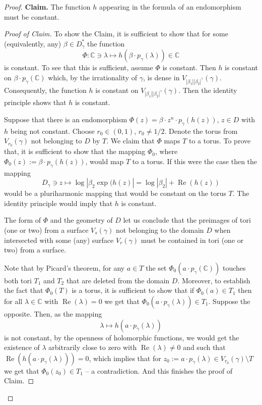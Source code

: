 \documentclass[a4paper,12pt]{amsart}
\theoremstyle{definition}
\begin{document}
\begin{proof}
\bigskip

{\bf Claim.} The function $h$ appearing in the formula of an endomorphism must be constant. 

\begin{proof}[Proof of Claim] To show the Claim, it is sufficient to show that for some (equivalently, any) $\beta\in D_{\gamma}^*$ the function
\begin{equation}
 \Phi \colon \mathbb C\owns\lambda \mapsto h(\beta\cdot p_{\gamma}(\lambda))\in\mathbb C
\end{equation}
is constant. To see that this is sufficient, assume $\Phi$ is constant. Then $h$ is constant on $\beta\cdot p_{\gamma}(\mathbb C)$ which, by the irrationality of $\gamma$, is dense in
$V_{|\beta_1||\beta_2|^{\gamma}}(\gamma)$. Consequently, the function $h$ is constant on $V_{|\beta_1||\beta_2|^{\gamma}}(\gamma)$. Then the identity principle shows that $h$ is constant.

Suppose that there is an endomorphism $\Phi(z)=\beta\cdot z^n\cdot p_{\gamma}(h(z))$, $z\in D$ with $h$ being not constant. Choose $r_0\in(0,1)$, $r_0\neq 1/2$. Denote the torus from $V_{r_0}(\gamma)$ not belonging to $D$ by $T$. We claim that $\Phi$ maps $T$ to a torus. To prove that, it is sufficient to show that the mapping $\Phi_0$, where $\Phi_0(z):=\beta\cdot p_{\gamma}(h(z))$, would map $T$ to a torus. If this were the case then the mapping 
\begin{equation}
    D_{\gamma}\owns z \mapsto \log |\beta_2 \exp(h(z)|=\log|\beta_2|+\operatorname{Re}(h(z))
\end{equation}
would be a pluriharmonic mapping that would be constant on the torus $T$. The identity principle would imply that $h$ is constant.

The form of $\Phi$ and the geometry of $D$ let us conclude that the preimages of tori (one or two) from a surface $V_s(\gamma)$ not belonging to the domain $D$ when intersected with some (any) surface $V_r(\gamma)$ must be contained in tori (one or two) from a surface.

Note that by Picard's theorem, for any $a\in T$ the set $\Phi_0(a\cdot p_{\gamma}(\mathbb C))$ touches both tori $T_1$ and $T_2$ that are deleted from the domain $D$. Moreover, to establish the fact that $\Phi_0(T)$ is a torus, it is sufficient to show that if $\Phi_0(a)\in T_1$ then for all $\lambda\in\mathbb C$ with $\operatorname{Re}(\lambda)=0$ we get that $\Phi_0(a\cdot p_{\gamma}(\lambda))\in T_1$. Suppose the opposite. Then, as the mapping
\begin{equation}
    \lambda\mapsto h(a\cdot p_{\gamma}(\lambda))
\end{equation}
is not constant, by the openness of holomorphic functions, we would get the existence of $\lambda$ arbitrarily close to zero with $\operatorname{Re}(\lambda)\neq 0$ and such that $\operatorname{Re}(h(a\cdot p_{\gamma}(\lambda)))=0$, which implies that for $z_0:=a\cdot p_{\gamma}(\lambda)\in V_{r_0}(\gamma)\setminus T$ we get that $\Phi_0(z_0)\in T_1$  -- a contradiction. And this finishes the proof of Claim. 
\end{proof}


\end{proof}
\end{document}
